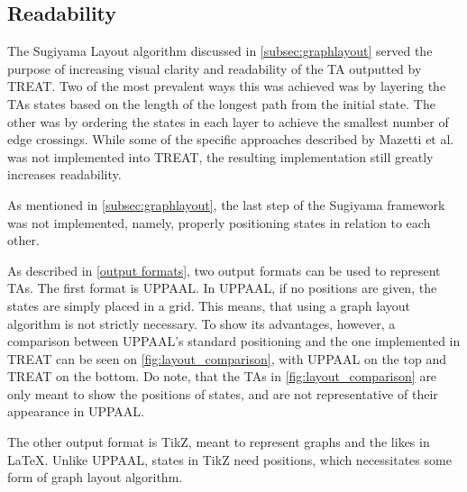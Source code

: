 \subsection{Readability}

The Sugiyama Layout algorithm discussed in \cref{subsec:graphlayout} served the purpose of increasing visual clarity and readability of the TA outputted by TREAT.
Two of the most prevalent ways this was achieved was by layering the TAs states based on the length of the longest path from the initial state. The other was by ordering the states in each layer to achieve the smallest number of edge crossings.
While some of the specific approaches described by Mazetti et al. \cite{Mazetti2012} was not implemented into TREAT, the resulting implementation still greatly increases readability.

As mentioned in \cref{subsec:graphlayout}, the last step of the Sugiyama framework was not implemented, namely, properly positioning states in relation to each other.

As described in \cref{output formats}, two output formats can be used to represent TAs. The first format is UPPAAL. In UPPAAL, if no positions are given, the states are simply placed in a grid. This means, that using a graph layout algorithm is not strictly necessary. To show its advantages, however, a comparison between UPPAAL's standard positioning and the one implemented in TREAT can be seen on \cref{fig:layout_comparison}, with UPPAAL on the top and TREAT on the bottom.
Do note, that the TAs in \cref{fig:layout_comparison} are only meant to show the positions of states, and are not representative of their appearance in UPPAAL.

\begin{center}
    
    
\end{center}
\vspace{1em}

The other output format is TikZ, meant to represent graphs and the likes in LaTeX. Unlike UPPAAL, states in TikZ need positions, which necessitates some form of graph layout algorithm.




